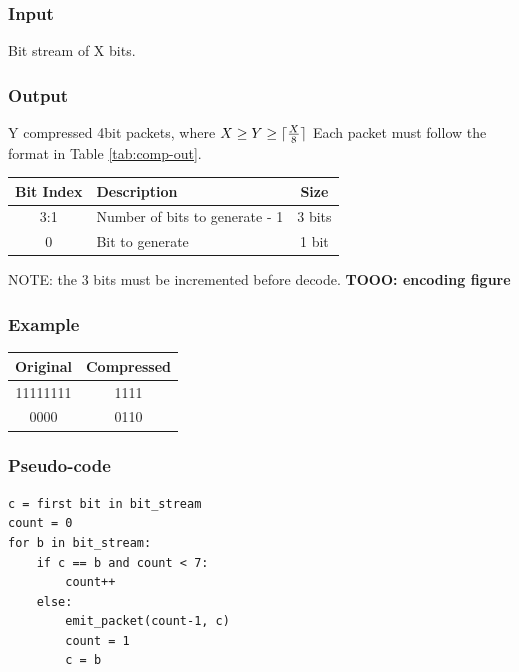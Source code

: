 \documentclass[12pt]{report}
\DeclarePairedDelimiter\ceil{\lceil}{\rceil}
\begin{document}
\subsubsection{Input}
Bit stream of X bits.

\subsubsection{Output}
Y compressed 4bit packets, where $X \geq Y \geq \ceil{\frac{X}{8}}$
Each packet must follow the format in Table \ref{tab:comp-out}.

\begin{center}
 \begin{tabular}{||c |l |c||} 
 \hline
 Bit Index & Description & Size \\ [0.5ex] 
 \hline\hline
  3:1 & Number of bits to generate - 1 & 3 bits  \\ 
 \hline
 0  & Bit to generate &  1 bit \\ [1ex] 
 \hline
\end{tabular}
\end{center}
NOTE: the 3 bits must be incremented before decode.
\textbf{TOOO: encoding figure}

\subsubsection{Example}

\begin{center}
 \begin{tabular}{||c |c||} 
 \hline
 Original & Compressed \\ [0.5ex] 
 \hline\hline
  11111111 & 1111 \\ 
 \hline
 0000  & 0110 \\ [1ex] 
 \hline
\end{tabular}
\end{center}

\subsubsection{Pseudo-code}
\begin{verbatim}
c = first bit in bit_stream
count = 0
for b in bit_stream:
    if c == b and count < 7:
        count++
    else:
        emit_packet(count-1, c)
        count = 1
        c = b
\end{verbatim}
\end{document}
